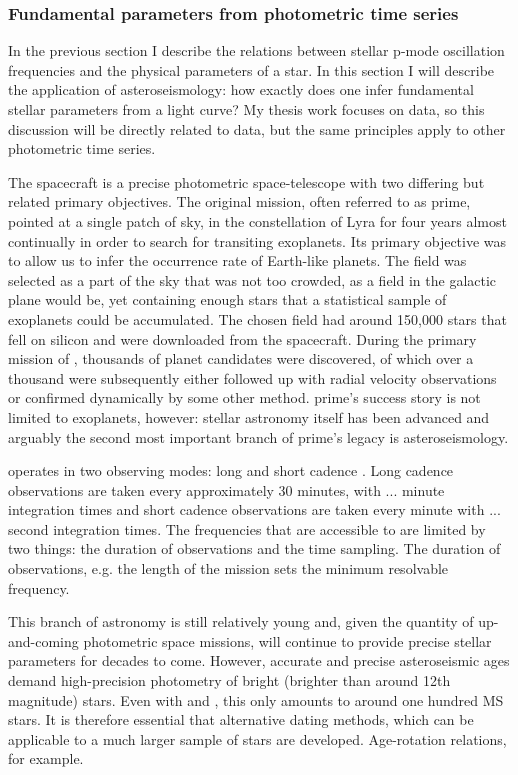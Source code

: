 \subsubsection*{Fundamental parameters from photometric time series}

In the previous section I describe the relations between stellar p-mode
oscillation frequencies and the physical parameters of a star.
In this section I will describe the application of asteroseismology: how
exactly does one infer fundamental stellar parameters from a light curve?
My thesis work focuses on \kepler data, so this discussion will be directly
related to \kepler data, but the same principles apply to other photometric
time series.

The \kepler spacecraft is a precise photometric space-telescope with two
differing but related primary objectives.
The original mission, often referred to as \kepler prime, pointed at a single
patch of sky, in the constellation of Lyra for four years almost continually
in order to search for transiting exoplanets.
Its primary objective was to allow us to infer the occurrence rate of
Earth-like planets.
The \kepler field was selected as a part of the sky that was not too crowded,
as a field in the galactic plane would be, yet containing enough stars that a
statistical sample of exoplanets could be accumulated.
The chosen field had around 150,000 stars that fell on silicon and were
downloaded from the spacecraft.
During the primary mission of \kepler, thousands of planet candidates were
discovered, of which over a thousand were subsequently either followed up with
radial velocity observations or confirmed dynamically by some other method.
\kepler prime's success story is not limited to exoplanets, however: stellar
astronomy itself has been advanced and arguably the second most important
branch of \kepler prime's legacy is asteroseismology.

\kepler operates in two observing modes: long and short cadence
\citep[][]{smith2012, stumpe2012}.
Long cadence observations are taken every approximately 30 minutes, with ...
minute integration times and short cadence observations are taken every minute
with ... second integration times.
The frequencies that are accessible to \kepler are limited by two things: the
duration of observations and the time sampling.
The duration of observations, e.g. the length of the \kepler mission sets the
minimum resolvable frequency.

This branch of astronomy is still relatively young and, given the quantity of
up-and-coming photometric space missions, will continue to provide precise
stellar parameters for decades to come.
However, accurate and precise asteroseismic ages demand high-precision
photometry of bright (brighter than around 12th magnitude) stars.
Even with \kepler and \corot, this only amounts to around one hundred MS
stars.
It is therefore essential that alternative dating methods, which can be
applicable to a much larger sample of stars are developed.
Age-rotation relations, for example.

